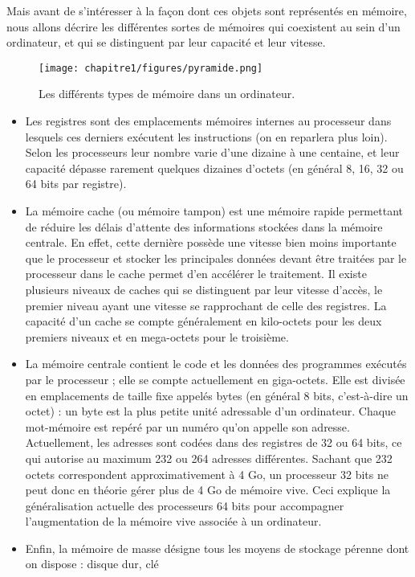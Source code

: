 Mais avant de s’intéresser à la façon dont ces objets sont représentés en mémoire, nous allons décrire les
différentes sortes de mémoires qui coexistent au sein d’un ordinateur, et qui se distinguent par leur capacité et
leur vitesse.


\begin{figure}
    \centering
    \texttt{[image: chapitre1/figures/pyramide.png]}
    \caption{Les différents types de mémoire dans un ordinateur.}
    \label{fig:my_label}
\end{figure}

\begin{itemize}
    \item Les registres sont des emplacements mémoires internes au processeur dans lesquels ces derniers exécutent
les instructions (on en reparlera plus loin). Selon les processeurs leur nombre varie d’une dizaine à une
centaine, et leur capacité dépasse rarement quelques dizaines d’octets (en général 8, 16, 32 ou 64 bits par
registre).
\item La mémoire cache (ou mémoire tampon) est une mémoire rapide permettant de réduire les délais d’attente
des informations stockées dans la mémoire centrale. En effet, cette dernière possède une vitesse bien moins
importante que le processeur et stocker les principales données devant être traitées par le processeur dans
le cache permet d’en accélérer le traitement. Il existe plusieurs niveaux de caches qui se distinguent par
leur vitesse d’accès, le premier niveau ayant une vitesse se rapprochant de celle des registres. La capacité
d’un cache se compte généralement en kilo-octets pour les deux premiers niveaux et en mega-octets pour
le troisième.
\item La mémoire centrale contient le code et les données des programmes exécutés par le processeur ; elle se
compte actuellement en giga-octets. Elle est divisée en emplacements de taille fixe appelés bytes (en
général 8 bits, c’est-à-dire un octet) : un byte est la plus petite unité adressable d’un ordinateur. Chaque
mot-mémoire est repéré par un numéro qu’on appelle son adresse. Actuellement, les adresses sont codées
dans des registres de 32 ou 64 bits, ce qui autorise au maximum 232 ou 264 adresses différentes. Sachant
que 232 octets correspondent approximativement à 4 Go, un processeur 32 bits ne peut donc en théorie
gérer plus de 4 Go de mémoire vive. Ceci explique la généralisation actuelle des processeurs 64 bits pour
accompagner l’augmentation de la mémoire vive associée à un ordinateur.
\item Enfin, la mémoire de masse désigne tous les moyens de stockage pérenne dont on dispose : disque dur, clé

\end{itemize}
